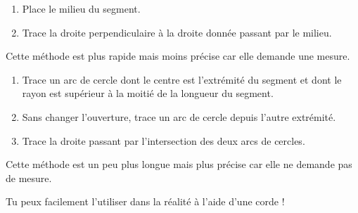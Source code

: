 \documentclass[../../syllabus_1.tex]{subfiles}
\begin{document}
\begin{tcolorbox}[title= Avec l'équerre, width=.49\linewidth,
        nobeforeafter,equal height group=A]
    \begin{minipage}[t][12cm]{\linewidth}
        \begin{enumerate}
            \item Place le milieu du segment.
            \item Trace la droite perpendiculaire à la droite donnée passant par le milieu.
        \end{enumerate}
        \vfil
        \begin{center}
        \end{center}
    \end{minipage}
    \tcblower
    Cette méthode est plus rapide mais moins précise car elle demande une mesure.
\end{tcolorbox}
\hfill
\begin{tcolorbox}[title= Avec le compas, width=.49\linewidth, nobeforeafter,equal height group=A]
    \begin{minipage}[t][12cm]{\linewidth}
        \begin{enumerate}
            \item Trace un arc de cercle dont le centre est l'extrémité du segment
                  et dont le rayon est supérieur à la moitié de la longueur du segment.
            \item Sans changer l'ouverture, trace un arc de cercle depuis l'autre extrémité.
            \item Trace la droite passant par l'intersection des deux arcs de cercles.
        \end{enumerate}
        \vfil
        \begin{center}
        \end{center}
    \end{minipage}
    \tcblower
    Cette méthode est un peu plus longue mais plus précise car elle ne demande
    pas de mesure.

    Tu peux facilement l'utiliser dans la réalité à l'aide d'une corde !
\end{tcolorbox}
\end{document}
